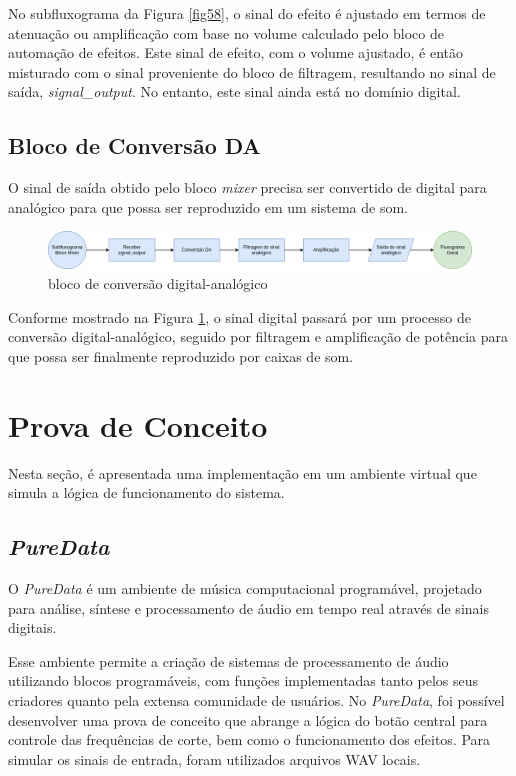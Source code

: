 No subfluxograma da Figura \ref{fig58}, o sinal do efeito é ajustado em termos de atenuação ou amplificação com base no volume calculado pelo bloco de automação de efeitos. Este sinal de efeito, com o volume ajustado, é então misturado com o sinal proveniente do bloco de filtragem, resultando no sinal de saída, \textit{signal\_output}. No entanto, este sinal ainda está no domínio digital.

\subsection{Bloco de Conversão DA}

O sinal de saída obtido pelo bloco \textit{mixer} precisa ser convertido de digital para analógico para que possa ser reproduzido em um sistema de som.

\begin{figure}[h]
    \centering
    \includegraphics[width=\textwidth]{figuras/fig59.png}
    \caption{bloco de conversão digital-analógico}
    \label{fig59}
\end{figure}

Conforme mostrado na Figura \ref{fig59}, o sinal digital passará por um processo de conversão digital-analógico, seguido por filtragem e amplificação de potência para que possa ser finalmente reproduzido por caixas de som.

\newpage
\section{Prova de Conceito}

Nesta seção, é apresentada uma implementação em um ambiente virtual que simula a lógica de funcionamento do sistema.

\subsection{\textit{PureData}}

O \textit{PureData} \cite{puredata} é um ambiente de música computacional programável, projetado para análise, síntese e processamento de áudio em tempo real através de sinais digitais.

Esse ambiente permite a criação de sistemas de processamento de áudio utilizando blocos programáveis, com funções implementadas tanto pelos seus criadores quanto pela extensa comunidade de usuários. No \textit{PureData}, foi possível desenvolver uma prova de conceito que abrange a lógica do botão central para controle das frequências de corte, bem como o funcionamento dos efeitos. Para simular os sinais de entrada, foram utilizados arquivos WAV locais.

